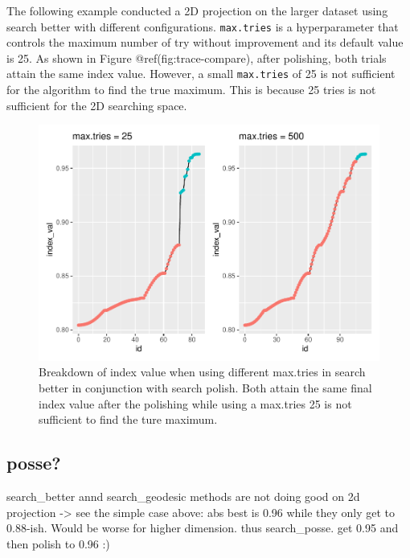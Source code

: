 \documentclass[12pt]{article}
\begin{document}
The following example conducted a 2D projection on the larger dataset
using search better with different configurations. \texttt{max.tries} is
a hyperparameter that controls the maximum number of try without
improvement and its default value is 25. As shown in Figure
@ref(fig:trace-compare), after polishing, both trials attain the same
index value. However, a small \texttt{max.tries} of 25 is not sufficient
for the algorithm to find the true maximum. This is because 25 tries is
not sufficient for the 2D searching space.

\begin{figure}
\centering
\includegraphics{paper_files/figure-latex/trace-compare-1.pdf}
\caption{Breakdown of index value when using different max.tries in
search better in conjunction with search polish. Both attain the same
final index value after the polishing while using a max.tries 25 is not
sufficient to find the ture maximum.}
\end{figure}

\hypertarget{posse}{%
\subsection{posse?}\label{posse}}

search\_better annd search\_geodesic methods are not doing good on 2d
projection -\textgreater{} see the simple case above: abs best is 0.96
while they only get to 0.88-ish. Would be worse for higher dimension.
thus search\_posse. get 0.95 and then polish to 0.96 :)



\end{document}
